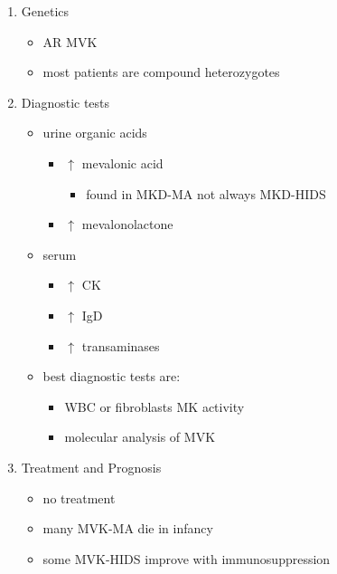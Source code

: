 \documentclass[12pt]{scrartcl}
\begin{document}
\begin{enumerate}
\item Genetics
\label{sec:orge805a8a}
\begin{itemize}
\item AR MVK
\item most patients are compound heterozygotes
\end{itemize}

\item Diagnostic tests
\label{sec:org3f59d15}
\begin{itemize}
\item urine organic acids
\begin{itemize}
\item \(\uparrow\) mevalonic acid
\begin{itemize}
\item found in MKD-MA not always MKD-HIDS
\end{itemize}
\item \(\uparrow\) mevalonolactone
\end{itemize}
\item serum
\begin{itemize}
\item \(\uparrow\) CK
\item \(\uparrow\) IgD
\item \(\uparrow\) transaminases
\end{itemize}
\item best diagnostic tests are:
\begin{itemize}
\item WBC or fibroblasts MK activity
\item molecular analysis of MVK
\end{itemize}
\end{itemize}

\item Treatment and Prognosis
\label{sec:org32b1912}
\begin{itemize}
\item no treatment
\item many MVK-MA die in infancy
\item some MVK-HIDS improve with immunosuppression
\end{itemize}
\end{enumerate}
\end{document}
